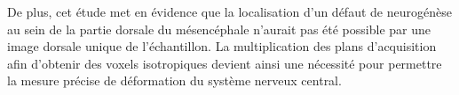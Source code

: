 \documentclass[\main/main.tex]{subfiles}
\begin{document}
De plus, cet étude met en évidence que la localisation d'un défaut de neurogénèse au sein de la partie dorsale du
mésencéphale n'aurait pas été possible par une image dorsale unique de l'échantillon.
%
La multiplication des plans d'acquisition  afin d'obtenir des voxels isotropiques devient ainsi une nécessité
pour permettre la mesure précise de déformation du système nerveux central.
\end{document}

